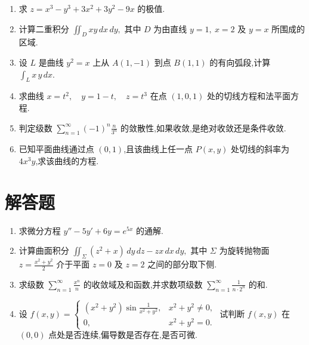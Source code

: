 \begin{enumerate}
	\item 求
	$
	z=x^3-y^3+3x^2+3y^2-9x
	$
	的极值.
	
	\item 计算二重积分
	$
	\iint_D xy\,dx\,dy,
	$
	其中 $D$ 为由直线 $y=1,\ x=2$ 及 $y=x$ 所围成的区域.
	
	\item 设 $L$ 是曲线 $y^2=x$ 上从 $A(1,-1)$ 到点 $B(1,1)$ 的有向弧段,计算
	$
	\int_L x\,y\,dx.
	$
	
	\item 求曲线
	$
	x=t^2,\quad y=1-t,\quad z=t^3
	$
	在点 $(1,0,1)$ 处的切线方程和法平面方程.
	
	\item 判定级数
	$
	\sum_{n=1}^{\infty}(-1)^n\frac{n}{3^n}
	$
	的敛散性,如果收敛,是绝对收敛还是条件收敛.
	
	\item 已知平面曲线通过点 $(0,1)$,且该曲线上任一点 $P(x,y)$ 处切线的斜率为 $4x^3y$,求该曲线的方程.
\end{enumerate}

\section{解答题}

\begin{enumerate}
\item 求微分方程
$
y''-5y'+6y=e^{5x}
$
的通解.


\item 计算曲面积分
$
\iint_{\Sigma}(z^2+x)\,dy\,dz-zx\,dx\,dy,
$
其中 $\Sigma$ 为旋转抛物面
$
z=\frac{x^2+y^2}{2}
$
介于平面 $z=0$ 及 $z=2$ 之间的部分取下侧.



\item 求级数
$
\sum_{n=1}^{\infty}\frac{x^n}{n}
$
的收敛域及和函数,并求数项级数
$
\sum_{n=1}^{\infty}\frac{1}{n\cdot 2^n}
$
的和.

\item 设
$
f(x,y)=
\begin{cases}
	(x^2+y^2)\sin\frac{1}{x^2+y^2}, & x^2+y^2\ne 0,\\
	0, & x^2+y^2=0.
\end{cases}
$
试判断 $f(x,y)$ 在 $(0,0)$ 点处是否连续,偏导数是否存在,是否可微.

\end{enumerate}
\newpage
